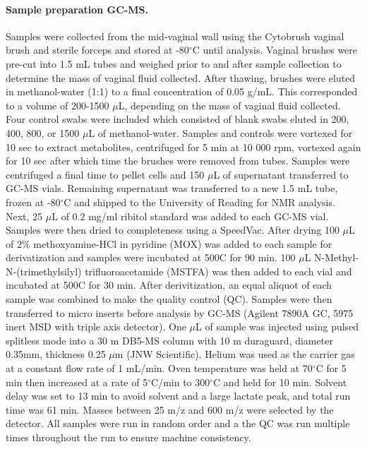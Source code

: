 \documentclass[10pt,letterpaper]{article}
\begin{document}
\paragraph{Sample preparation GC-MS.} Samples were collected from the mid-vaginal wall using the Cytobrush vaginal brush and sterile forceps and stored at -80$^\circ$C until analysis. Vaginal brushes were pre-cut into 1.5 mL tubes and weighed prior to and after sample collection to determine the mass of vaginal fluid collected. After thawing, brushes were eluted in methanol-water (1:1) to a final concentration of 0.05 g/mL. This corresponded to a volume of 200-1500 $\mu$L, depending on the mass of vaginal fluid collected. Four control swabs were included which consisted of blank swabs eluted in 200, 400, 800, or 1500  $\mu$L of methanol-water. Samples and controls were vortexed for 10 sec to extract metabolites, centrifuged for 5 min at 10 000 rpm, vortexed again for 10 sec after which time the brushes were removed from tubes. Samples were centrifuged a final time to pellet cells and 150  $\mu$L of supernatant transferred to GC-MS vials. Remaining supernatant was transferred to a new 1.5 mL tube, frozen at -80$^\circ$C and shipped to the University of Reading for NMR analysis. Next, 25  $\mu$L of 0.2 mg/ml ribitol standard was added to each GC-MS vial. Samples were then dried to completeness using a SpeedVac. After drying 100  $\mu$L of 2\% methoxyamine-HCl in pyridine (MOX) was added to each sample for derivatization and samples were incubated at 500C for 90 min. 100  $\mu$L N-Methyl-N-(trimethylsilyl) trifluoroacetamide (MSTFA) was then added to each vial and incubated at 500C for 30 min. After derivitization, an equal aliquot of each sample was combined to make the quality control (QC). Samples were then transferred to micro inserts before analysis by GC-MS (Agilent 7890A GC, 5975 inert MSD with triple axis detector). One  $\mu$L of sample was injected using pulsed splitless mode into a 30 m DB5-MS column with 10 m duraguard, diameter 0.35mm, thickness 0.25  $\mu$m (JNW Scientific). Helium was used as the carrier gas at a constant flow rate of 1 mL/min. Oven temperature was held at 70$^\circ$C for 5 min then increased at a rate of 5$^\circ$C/min to 300$^\circ$C and held for 10 min. Solvent delay was set to 13 min to avoid solvent and a large lactate peak, and total run time was 61 min. Masses between 25 m/z and 600 m/z were selected by the detector. All samples were run in random order and a the QC was run multiple times throughout the run to ensure machine consistency. 
\end{document}
